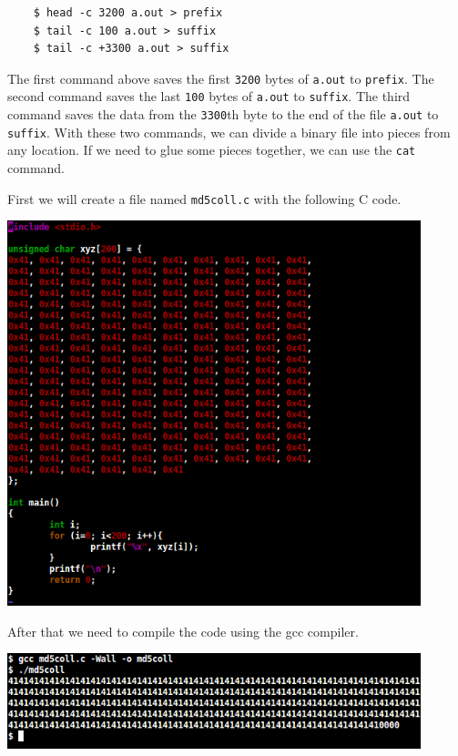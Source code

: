 \documentclass[a4paper]{article}
\begin{document}
\begin{verbatim}
    $ head -c 3200 a.out > prefix
    $ tail -c 100 a.out > suffix
    $ tail -c +3300 a.out > suffix
\end{verbatim}

The first command above saves the first \texttt{3200} bytes of \texttt{a.out} to \texttt{prefix}. The second command saves the last \texttt{100} bytes of \texttt{a.out} to \texttt{suffix}. The third command saves the data from the \texttt{3300}th byte to the end of the file \texttt{a.out} to \texttt{suffix}. With these two commands, we can divide a binary file into pieces from any location. If we need to glue some pieces together, we can use the \texttt{cat} command.

\bigskip

First we will create a file named \texttt{md5coll.c} with the following C code.

\bigskip

\includegraphics[width=0.9\textwidth]{bash/md5coll.png}

\bigskip

After that we need to compile the code using the gcc compiler.

\bigskip

\includegraphics[width=0.9\textwidth]{bash/md5collgcc.png}
\end{document}
